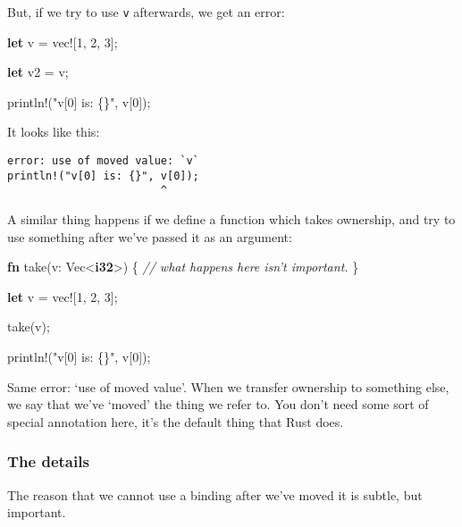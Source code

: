 \documentclass[a4paper,]{book}
\newenvironment{Shaded}{\begin{snugshade}}{\end{snugshade}}
\newcommand{\KeywordTok}[1]{\textcolor[rgb]{0.13,0.29,0.53}{\textbf{{#1}}}}
\newcommand{\DecValTok}[1]{\textcolor[rgb]{0.00,0.00,0.81}{{#1}}}
\newcommand{\StringTok}[1]{\textcolor[rgb]{0.31,0.60,0.02}{{#1}}}
\newcommand{\CommentTok}[1]{\textcolor[rgb]{0.56,0.35,0.01}{\textit{{#1}}}}
\newcommand{\OtherTok}[1]{\textcolor[rgb]{0.56,0.35,0.01}{{#1}}}
\newcommand{\NormalTok}[1]{{#1}}
\begin{document}
But, if we try to use \texttt{v} afterwards, we get an error:

\begin{Shaded}
\begin{Highlighting}[]
\KeywordTok{let} \NormalTok{v = }\OtherTok{vec!}\NormalTok{[}\DecValTok{1}\NormalTok{, }\DecValTok{2}\NormalTok{, }\DecValTok{3}\NormalTok{];}

\KeywordTok{let} \NormalTok{v2 = v;}

\OtherTok{println!}\NormalTok{(}\StringTok{"v[0] is: \{\}"}\NormalTok{, v[}\DecValTok{0}\NormalTok{]);}
\end{Highlighting}
\end{Shaded}

It looks like this:

\begin{verbatim}
error: use of moved value: `v`
println!("v[0] is: {}", v[0]);
                        ^
\end{verbatim}

A similar thing happens if we define a function which takes ownership,
and try to use something after we've passed it as an argument:

\begin{Shaded}
\begin{Highlighting}[]
\KeywordTok{fn} \NormalTok{take(v: Vec<}\KeywordTok{i32}\NormalTok{>) \{}
    \CommentTok{// what happens here isn’t important.}
\NormalTok{\}}

\KeywordTok{let} \NormalTok{v = }\OtherTok{vec!}\NormalTok{[}\DecValTok{1}\NormalTok{, }\DecValTok{2}\NormalTok{, }\DecValTok{3}\NormalTok{];}

\NormalTok{take(v);}

\OtherTok{println!}\NormalTok{(}\StringTok{"v[0] is: \{\}"}\NormalTok{, v[}\DecValTok{0}\NormalTok{]);}
\end{Highlighting}
\end{Shaded}

Same error: `use of moved value'. When we transfer ownership to
something else, we say that we've `moved' the thing we refer to. You
don't need some sort of special annotation here, it's the default thing
that Rust does.

\subsubsection{The details}\label{the-details}

The reason that we cannot use a binding after we've moved it is subtle,
but important.
\end{document}
